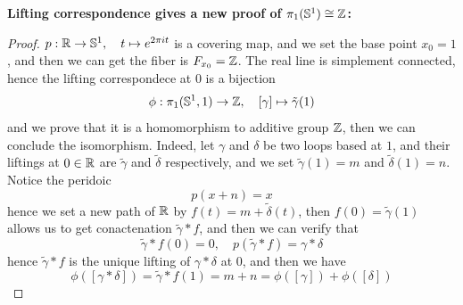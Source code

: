 \textbf{Lifting correspondence gives a new proof of \(\pi_1(\mathbb{S}^1) \cong \mathbb{Z}\):}
\begin{proof}
    \(p:\mathbb{R} \to \mathbb{S}^1,\quad t \mapsto e^{2\pi i t}\) is a covering map, and we set the base point \(x_0 = 1\), and then we can get the fiber is \(F_{x_0} = \mathbb{Z}\). The real line is simplement connected, hence the lifting correspondece at \(0\) is a bijection
    \[\phi: \pi_1(\mathbb{S}^1,1) \to \mathbb{Z}, \quad [\gamma] \mapsto \tilde{\gamma}(1)\]
    and we prove that it is a homomorphism to additive group \(\mathbb{Z}\), then we can conclude the isomorphism. Indeed, let \(\gamma\) and \(\delta\) be two loops based at \(1\), and their liftings at \(0 \in \mathbb{R}\) are \(\tilde{\gamma}\) and \(\tilde{\delta}\) respectively, and we set \(\tilde{\gamma}(1) = m\) and \(\tilde{\delta}(1) = n\). Notice the peridoic
    \[p(x+n)  = x\]
    hence we set a new path of \(\mathbb{R}\) by \(f(t) = m + \tilde{\delta}(t)\), then \(f(0) = \tilde{\gamma}(1)\) allows us to get conactenation \(\tilde{\gamma} * f\), and then we can verify that
    \[\tilde{\gamma}*f(0) = 0, \quad p(\tilde{\gamma}*f) = \gamma * \delta\]
    hence \(\tilde{\gamma}*f\) is the unique lifting of \(\gamma * \delta\) at \(0\), and then we have
    \[\phi([\gamma*\delta]) = \tilde{\gamma}*f(1) = m+n = \phi([\gamma])+ \phi([\delta])\]

\end{proof}








